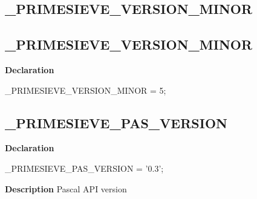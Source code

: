\documentclass{report}
\newif\ifpdf
\begin{document}
\subsection*{\large{\textbf{{\_}PRIMESIEVE{\_}VERSION{\_}MINOR}}\normalsize\hspace{1ex}\hrulefill}
\else
\subsection*{{\_}PRIMESIEVE{\_}VERSION{\_}MINOR}
\fi
\label{primesieve-_PRIMESIEVE_VERSION_MINOR}
\begin{list}{}{
\setlength{\itemindent}{0cm}
\setlength{\listparindent}{0cm}
\setlength{\leftmargin}{\evensidemargin}
\addtolength{\leftmargin}{\tmplength}
\settowidth{\labelsep}{X}
\addtolength{\leftmargin}{\labelsep}
\setlength{\labelwidth}{\tmplength}
}
\item[\textbf{Declaration}\hfill]
\ifpdf
\begin{flushleft}
\fi
\begin{ttfamily}
{\_}PRIMESIEVE{\_}VERSION{\_}MINOR = 5;\end{ttfamily}

\ifpdf
\end{flushleft}
\fi

\end{list}
\ifpdf
\subsection*{\large{\textbf{{\_}PRIMESIEVE{\_}PAS{\_}VERSION}}\normalsize\hspace{1ex}\hrulefill}
\else
\subsection*{{\_}PRIMESIEVE{\_}PAS{\_}VERSION}
\fi
\label{primesieve-_PRIMESIEVE_PAS_VERSION}
\begin{list}{}{
\setlength{\itemindent}{0cm}
\setlength{\listparindent}{0cm}
\setlength{\leftmargin}{\evensidemargin}
\addtolength{\leftmargin}{\tmplength}
\settowidth{\labelsep}{X}
\addtolength{\leftmargin}{\labelsep}
\setlength{\labelwidth}{\tmplength}
}
\item[\textbf{Declaration}\hfill]
\ifpdf
\begin{flushleft}
\fi
\begin{ttfamily}
{\_}PRIMESIEVE{\_}PAS{\_}VERSION = '0.3';\end{ttfamily}

\ifpdf
\end{flushleft}
\fi

\par
\item[\textbf{Description}]
Pascal API version

\end{list}
\ifpdf
\end{document}
